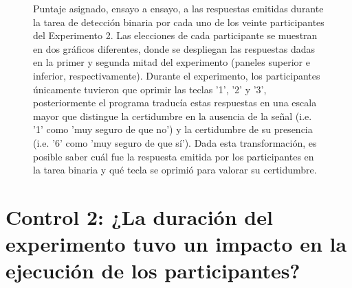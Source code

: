 \begin{figure}[th]
\caption[Puntajes de Confianza asignados ensayo a ensayo; Experimento 2]{Puntaje asignado, ensayo a ensayo, a las respuestas emitidas durante la tarea de detección binaria por cada uno de los veinte participantes del Experimento 2. Las elecciones de cada participante se muestran en dos gráficos diferentes, donde se despliegan las respuestas dadas en la primer y segunda mitad del experimento (paneles superior e inferior, respectivamente). Durante el experimento, los participantes únicamente tuvieron que oprimir las teclas '1', '2' y '3', posteriormente el programa traducía estas respuestas en una escala mayor que distingue la certidumbre en la ausencia de la señal (i.e. '1' como 'muy seguro de que no') y la certidumbre de su presencia (i.e. '6' como 'muy seguro de que sí'). Dada esta transformación, es posible saber cuál fue la respuesta emitida por los participantes en la tarea binaria y qué tecla se oprimió para valorar su certidumbre.}
\label{fig:Rating_E2}
\end{figure}











\section{Control 2: ¿La duración del experimento tuvo un impacto en la ejecución de los participantes?}

